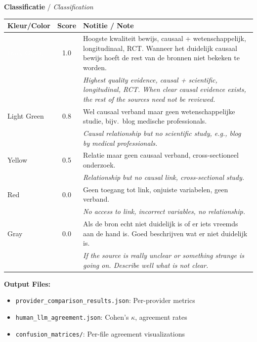 \begin{table}[H]
\vspace{1em}

\textbf{Classificatie} / \textit{Classification}

\vspace{0.5em}

\begin{tabular}{|>{\columncolor{green!70!black}\color{white}}p{2cm}|c|p{8cm}|}
\hline
\textbf{Kleur/Color} & \textbf{Score} & \textbf{Notitie / Note} \\
\hline
\cellcolor{green!70!black}\textcolor{white}{Dark Green} & 1.0 & 
Hoogste kwaliteit bewijs, causaal + wetenschappelijk, longitudinaal, RCT. Wanneer het duidelijk causaal bewijs hoeft de rest van de bronnen niet bekeken te worden. \\
& & \textit{Highest quality evidence, causal + scientific, longitudinal, RCT. When clear causal evidence exists, the rest of the sources need not be reviewed.} \\
\hline
\cellcolor{green!50} Light Green & 0.8 & 
Wel causaal verband maar geen wetenschappelijke studie, bijv.\ blog medische professionals. \\
& & \textit{Causal relationship but no scientific study, e.g., blog by medical professionals.} \\
\hline
\cellcolor{yellow!80} Yellow & 0.5 & 
Relatie maar geen causaal verband, cross-sectioneel onderzoek. \\
& & \textit{Relationship but no causal link, cross-sectional study.} \\
\hline
\cellcolor{red!70} Red & 0.0 & 
Geen toegang tot link, onjuiste variabelen, geen verband. \\
& & \textit{No access to link, incorrect variables, no relationship.} \\
\hline
\cellcolor{gray!50} Gray & 0.0 & 
Als de bron echt niet duidelijk is of er iets vreemds aan de hand is. Goed beschrijven wat er niet duidelijk is. \\
& & \textit{If the source is really unclear or something strange is going on. Describe well what is not clear.} \\
\hline
\end{tabular}

\end{table}

\textbf{Output Files:}
\begin{itemize}[noitemsep]
    \item \texttt{provider\_comparison\_results.json}: Per-provider metrics
    \item \texttt{human\_llm\_agreement.json}: Cohen's $\kappa$, agreement rates
    \item \texttt{confusion\_matrices/}: Per-file agreement visualizations
\end{itemize}

